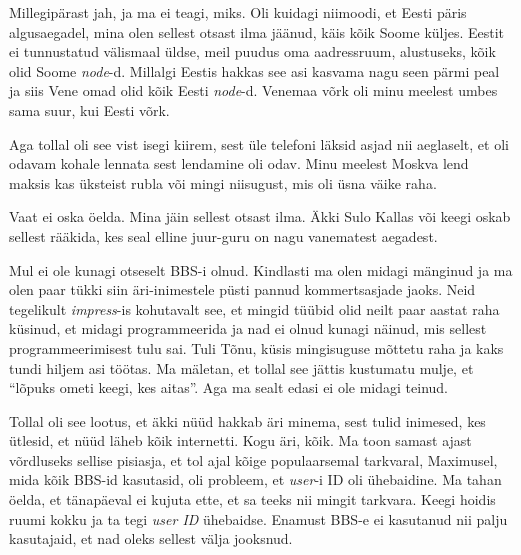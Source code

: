 
Millegipärast jah, ja ma ei teagi, miks. Oli kuidagi niimoodi, et Eesti päris algusaegadel, mina olen sellest otsast ilma jäänud, käis kõik Soome küljes. Eestit ei tunnustatud välismaal üldse, meil puudus oma aadressruum, alustuseks, kõik olid Soome \emph{node}-d. Millalgi Eestis hakkas see asi kasvama nagu seen pärmi peal ja siis Vene omad olid kõik Eesti \emph{node}-d. Venemaa võrk oli minu meelest umbes sama suur, kui Eesti võrk. 


Aga tollal oli see vist isegi kiirem, sest üle telefoni läksid asjad nii aeglaselt, et oli odavam kohale lennata sest  lendamine oli odav. Minu meelest Moskva lend maksis kas üksteist rubla või mingi niisugust, mis oli üsna väike raha.


Vaat ei oska öelda. Mina jäin sellest otsast ilma. Äkki Sulo Kallas või keegi oskab sellest rääkida, kes seal elline juur-guru on nagu vanematest aegadest. 


Mul ei ole kunagi otseselt BBS-i olnud. Kindlasti ma olen midagi mänginud ja ma olen paar tükki siin äri-inimestele püsti pannud  kommertsasjade jaoks. Neid tegelikult \emph{impress}-is kohutavalt see, et  mingid tüübid olid neilt paar aastat raha küsinud, et midagi programmeerida ja nad ei olnud kunagi näinud, mis sellest programmeerimisest tulu sai.  Tuli Tõnu, küsis mingisuguse mõttetu raha ja kaks tundi hiljem asi töötas. Ma mäletan, et tollal see jättis kustumatu mulje, et \enquote{lõpuks ometi keegi, kes aitas}. Aga ma sealt edasi ei ole midagi teinud. 


Tollal oli see lootus, et äkki nüüd hakkab äri minema, sest tulid inimesed, kes ütlesid, et nüüd läheb kõik internetti. Kogu äri, kõik. Ma toon samast ajast võrdluseks sellise pisiasja, et  tol ajal kõige populaarsemal tarkvaral, Maximusel, mida kõik BBS-id kasutasid, oli probleem, et \emph{user}-i  ID oli ühebaidine. Ma tahan öelda, et tänapäeval  ei kujuta ette, et sa teeks nii mingit tarkvara. Keegi hoidis ruumi kokku ja ta tegi \emph{user ID} ühebaidse. Enamust BBS-e ei kasutanud nii palju kasutajaid, et nad oleks sellest välja jooksnud. 

